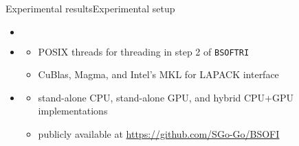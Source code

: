 \documentclass[xcolor=table,final]{beamer} %
\newcommand{\Bsoftri}{\texttt{BSOFTRI}\xspace}
\begin{document}
\begin{frame}{Experimental results}{Experimental setup}
  \renewcommand*\DTstyle{\sffamily\small}
  \renewcommand*\DTstylecomment{\footnotesize\textsl}
  \DTsetlength{0.2em}{1em}{0.2em}{0.4pt}{0.4pt}
  \begin{itemize}
  \item {}
    \begin{columns}
      \begin{column}{.5\textwidth}
      \end{column}
      \begin{column}{.5\textwidth}
      \end{column}
    \end{columns}

  \item {}
    \begin{itemize}
    \item POSIX threads for threading in step 2 of \Bsoftri
    \item CuBlas, Magma, and Intel's MKL for LAPACK interface
    \end{itemize}
    
  \item {}
    \begin{itemize}
    \item stand-alone CPU, stand-alone GPU, and hybrid CPU+GPU implementations
    \item publicly available at
      \url{https://github.com/SGo-Go/BSOFI}
    \end{itemize}
  \end{itemize}
\end{frame}

\end{document}

